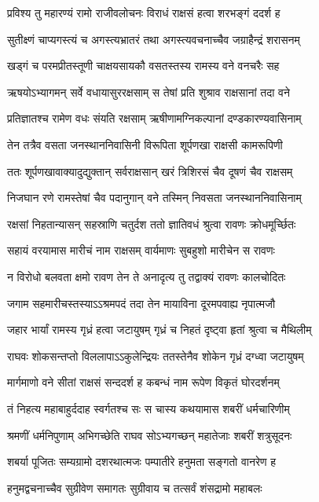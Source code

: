 \twolineshloka
{प्रविश्य तु महारण्यं रामो राजीवलोचनः}
{विराधं राक्षसं हत्वा शरभङ्गं ददर्श ह}%

\twolineshloka
{सुतीक्ष्णं चाप्यगस्त्यं च अगस्त्यभ्रातरं तथा}
{अगस्त्यवचनाच्चैव जग्राहैन्द्रं शरासनम्}%

\twolineshloka
{खड्गं च परमप्रीतस्तूणी चाक्षयसायकौ}
{वसतस्तस्य रामस्य वने वनचरैः सह}%

\twolineshloka
{ऋषयोऽभ्यागमन् सर्वे वधायासुररक्षसाम्}
{स तेषां प्रति शुश्राव राक्षसानां तदा वने}%

\twolineshloka
{प्रतिज्ञातश्च रामेण वधः संयति रक्षसाम्}
{ऋषीणामग्निकल्पानां दण्डकारण्यवासिनाम्}%

\twolineshloka
{तेन तत्रैव वसता जनस्थाननिवासिनी}
{विरूपिता शूर्पणखा राक्षसी कामरूपिणी}%

\twolineshloka
{ततः शूर्पणखावाक्यादुद्युक्तान् सर्वराक्षसान्}
{खरं त्रिशिरसं चैव दूषणं चैव राक्षसम्}%

\twolineshloka
{निजघान रणे रामस्तेषां चैव पदानुगान्}
{वने तस्मिन् निवसता जनस्थाननिवासिनाम्}%

\twolineshloka
{रक्षसां निहतान्यासन् सहस्राणि चतुर्दश}
{ततो ज्ञातिवधं श्रुत्वा रावणः क्रोधमूर्च्छितः}%

\twolineshloka
{सहायं वरयामास मारीचं नाम राक्षसम्}
{वार्यमाणः सुबहुशो मारीचेन स रावणः}%

\twolineshloka
{न विरोधो बलवता क्षमो रावण तेन ते}
{अनादृत्य तु तद्वाक्यं रावणः कालचोदितः}%

\twolineshloka
{जगाम सहमारीचस्तस्याऽऽश्रमपदं तदा}
{तेन मायाविना दूरमपवाह्य नृपात्मजौ}%

\twolineshloka
{जहार भार्यां रामस्य गृध्रं हत्वा जटायुषम्}
{गृध्रं च निहतं दृष्ट्वा हृतां श्रुत्वा च मैथिलीम्}%

\twolineshloka
{राघवः शोकसन्तप्तो विललापाऽऽकुलेन्द्रियः}
{ततस्तेनैव शोकेन गृध्रं दग्ध्वा जटायुषम्}%

\twolineshloka
{मार्गमाणो वने सीतां राक्षसं सन्ददर्श ह}
{कबन्धं नाम रूपेण विकृतं घोरदर्शनम्}%

\twolineshloka
{तं निहत्य महाबाहुर्ददाह स्वर्गतश्च सः}
{स चास्य कथयामास शबरीं धर्मचारिणीम्}%

\twolineshloka
{श्रमणीं धर्मनिपुणाम् अभिगच्छेति राघव}
{सोऽभ्यगच्छन् महातेजाः शबरीं शत्रुसूदनः}%

\twolineshloka
{शबर्या पूजितः सम्यग्रामो दशरथात्मजः}
{पम्पातीरे हनुमता सङ्गतो वानरेण ह}%

\twolineshloka
{हनुमद्वचनाच्चैव सुग्रीवेण समागतः}
{सुग्रीवाय च तत्सर्वं शंसद्रामो महाबलः}%


